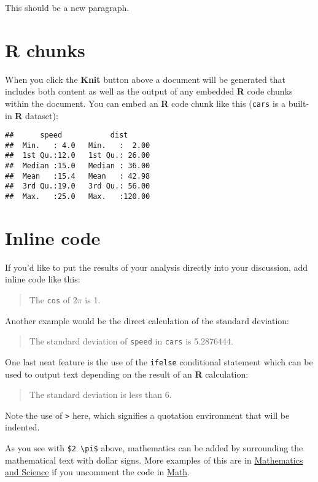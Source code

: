 \documentclass[print]{nuthesis}
\begin{document}
This should be a new paragraph.

\hypertarget{r-chunks}{%
\section{R chunks}\label{r-chunks}}

When you click the \textbf{Knit} button above a document will be generated that includes both content as well as the output of any embedded \textbf{R} code chunks within the document. You can embed an \textbf{R} code chunk like this (\texttt{cars} is a built-in \textbf{R} dataset):

\begin{verbatim}
##      speed           dist       
##  Min.   : 4.0   Min.   :  2.00  
##  1st Qu.:12.0   1st Qu.: 26.00  
##  Median :15.0   Median : 36.00  
##  Mean   :15.4   Mean   : 42.98  
##  3rd Qu.:19.0   3rd Qu.: 56.00  
##  Max.   :25.0   Max.   :120.00
\end{verbatim}

\hypertarget{inline-code}{%
\section{Inline code}\label{inline-code}}

If you'd like to put the results of your analysis directly into your discussion, add inline code like this:

\begin{quote}
The \texttt{cos} of \(2 \pi\) is 1.
\end{quote}

Another example would be the direct calculation of the standard deviation:

\begin{quote}
The standard deviation of \texttt{speed} in \texttt{cars} is 5.2876444.
\end{quote}

One last neat feature is the use of the \texttt{ifelse} conditional statement which can be used to output text depending on the result of an \textbf{R} calculation:

\begin{quote}
The standard deviation is less than 6.
\end{quote}

Note the use of \texttt{\textgreater{}} here, which signifies a quotation environment that will be indented.

As you see with \texttt{\$2\ \textbackslash{}pi\$} above, mathematics can be added by surrounding the mathematical text with dollar signs. More examples of this are in \protect\hyperlink{math-sci}{Mathematics and Science} if you uncomment the code in \protect\hyperlink{math}{Math}.
\end{document}

